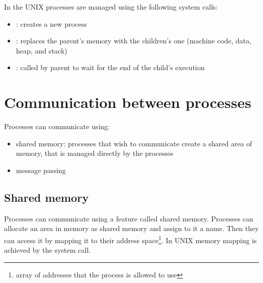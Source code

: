 In the UNIX processes are managed using the following system calls:
\begin{itemize}
  \item {}: creates a new process
  \item {}: replaces the parent's memory with the children's one (machine code, data, heap, and stack)
  \item {}: called by parent to wait for the end of the child's execution
\end{itemize}



\section{Communication between processes}
Processes can communicate using:
\begin{itemize}
  \item shared memory: processes that wish to communicate create a shared area of memory, that is managed directly by the processes
  \item message passing
\end{itemize}


\subsection{Shared memory}
Processes can communicate using a feature called shared memory. Processes can allocate an area in memory as shared memory and assign to it a name. Then they can access it by mapping it to their address space\footnote{array of addresses that the process is allowed to use}. In UNIX memory mapping is achieved by the  system call.


